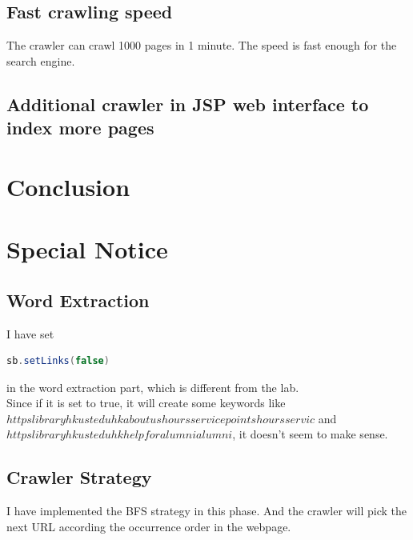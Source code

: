 \documentclass{article}
\begin{document}
        \subsection*{Fast crawling speed}
            The crawler can crawl 1000 pages in 1 minute. The speed is fast enough for the search engine.

        \subsection*{Additional crawler in JSP web interface to index more pages}

    \newpage
    \section*{Conclusion}

    \newpage
    \section*{Special Notice}
        \subsection*{Word Extraction}
            I have set 
            \begin{lstlisting}[language=Java]
                sb.setLinks(false)
            \end{lstlisting} 
            in the word extraction part, which is different from the lab. \\[0.4em] 
            Since if it is set to true, it will create some keywords like $httpslibraryhkusteduhkaboutushoursservicepointshoursservic$ and $httpslibraryhkusteduhkhelpforalumnialumni$, it doesn't seem to make sense. 
        \subsection*{Crawler Strategy}
            I have implemented the BFS strategy in this phase. And the crawler will pick the next URL according the occurrence order in the webpage.
\end{document}
